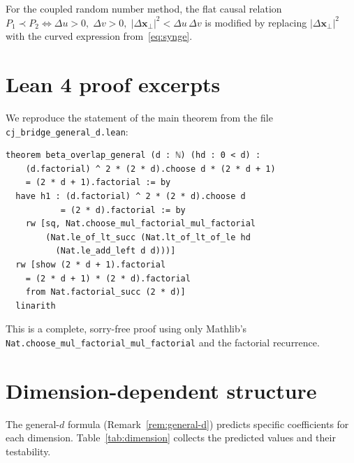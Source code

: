 \documentclass[12pt,a4paper]{article}
\theoremstyle{plain}
\theoremstyle{definition}
\theoremstyle{remark}
\begin{document}
For the coupled random number method, the flat causal relation
$P_1 \prec P_2 \Leftrightarrow \Delta u > 0,\; \Delta v > 0,\;
|\Delta\mathbf{x}_\perp|^2 < \Delta u\,\Delta v$ is modified by
replacing $|\Delta\mathbf{x}_\perp|^2$ with the curved
expression from~\eqref{eq:synge}.

\section{Lean 4 proof excerpts}
\label{app:lean}

We reproduce the statement of the main theorem from the file
\texttt{cj\_bridge\_general\_d.lean}:

\begin{verbatim}
theorem beta_overlap_general (d : ℕ) (hd : 0 < d) :
    (d.factorial) ^ 2 * (2 * d).choose d * (2 * d + 1)
    = (2 * d + 1).factorial := by
  have h1 : (d.factorial) ^ 2 * (2 * d).choose d
           = (2 * d).factorial := by
    rw [sq, Nat.choose_mul_factorial_mul_factorial
        (Nat.le_of_lt_succ (Nat.lt_of_lt_of_le hd
          (Nat.le_add_left d d)))]
  rw [show (2 * d + 1).factorial
    = (2 * d + 1) * (2 * d).factorial
    from Nat.factorial_succ (2 * d)]
  linarith
\end{verbatim}

\noindent
This is a complete, sorry-free proof using only Mathlib's
\texttt{Nat.choose\_mul\_factorial\_mul\_factorial} and the
factorial recurrence.

\section{Dimension-dependent structure}
\label{app:dimension}

The general-$d$ formula (Remark~\ref{rem:general-d}) predicts
specific coefficients for each dimension.  Table~\ref{tab:dimension}
collects the predicted values and their testability.
\end{document}
